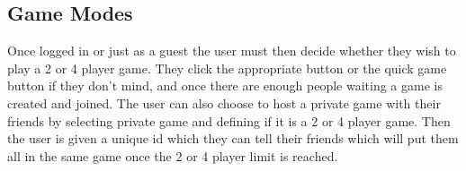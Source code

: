 \subsection{Game Modes}
Once logged in or just as a guest the user must then decide whether they wish to play a 2 or 4 player game. They click the appropriate button or the quick game button if they don't mind, and once there are enough people waiting a game is created and joined. The user can also choose to host a private game with their friends by selecting private game and defining if it is a 2 or 4 player game. Then the user is given a unique id which they can tell their friends which will put them all in the same game once the 2 or 4 player limit is reached.